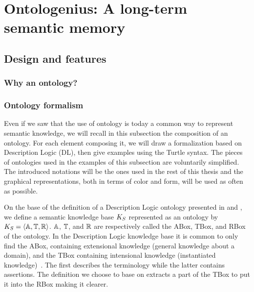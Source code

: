\ifdefined{}
\else
\setcounter{chapter}{2} %
\dominitoc
\faketableofcontents
\fi

\chapter{Ontologenius: A long-term semantic memory}
\label{chap:ontologenius}
\minitoc

\section{Design and features}

\subsection{Why an ontology?}

\subsection{Ontology formalism}
\label{sec:kb_formalism}

Even if we saw that the use of ontology is today a common way to represent semantic knowledge, we will recall in this subsection the composition of an ontology. For each element composing it, we will draw a formalization based on Description Logic (DL), then give examples using the Turtle syntax. The pieces of ontologies used in the examples of this subsection are voluntarily simplified. The introduced notations will be the ones used in the rest of this thesis and the graphical representations, both in terms of color and form, will be used as often as possible.

On the base of the definition of a Description Logic ontology presented in \cite{fokoue_2006_summary} and \cite{krotzsch_2013_description}, we define a semantic knowledge base $K_S$ represented as an ontology by  $K_S = \langle \mathbb{A}, \mathbb{T}, \mathbb{R} \rangle$. $\mathbb{A}$, $\mathbb{T}$, and $\mathbb{R}$ are respectively called the ABox, TBox, and RBox of the ontology. In the Description Logic knowledge base it is common to only find the ABox, containing extensional knowledge (general knowledge about a domain), and the TBox containing intensional knowledge (instantiated knowledge)~\cite{baader_2003_description}. The first describes the terminology while the latter contains assertions. The definition we choose to base on extracts a part of the TBox to put it into the RBox making it clearer.

